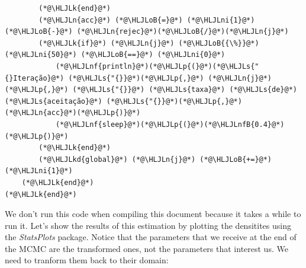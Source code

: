 \documentclass[12pt,a4paper]{article}
\newcommand{\HLJLk}[1]{\textcolor[RGB]{148,91,176}{\textbf{#1}}}
\newcommand{\HLJLkd}[1]{\textcolor[RGB]{214,102,97}{\textit{#1}}}
\newcommand{\HLJLn}[1]{#1}
\newcommand{\HLJLnf}[1]{\textcolor[RGB]{66,102,213}{#1}}
\newcommand{\HLJLs}[1]{\textcolor[RGB]{201,61,57}{#1}}
\newcommand{\HLJLnfB}[1]{\textcolor[RGB]{59,151,46}{#1}}
\newcommand{\HLJLni}[1]{\textcolor[RGB]{59,151,46}{#1}}
\newcommand{\HLJLoB}[1]{\textcolor[RGB]{102,102,102}{\textbf{#1}}}
\newcommand{\HLJLp}[1]{#1}
\begin{document}
\begin{lstlisting}
        (*@\HLJLk{end}@*)
        (*@\HLJLn{acc}@*) (*@\HLJLoB{=}@*) (*@\HLJLni{1}@*) (*@\HLJLoB{-}@*) (*@\HLJLn{rejec}@*)(*@\HLJLoB{/}@*)(*@\HLJLn{j}@*)
        (*@\HLJLk{if}@*) (*@\HLJLn{j}@*) (*@\HLJLoB{{\%}}@*) (*@\HLJLni{50}@*) (*@\HLJLoB{==}@*) (*@\HLJLni{0}@*)
            (*@\HLJLnf{println}@*)(*@\HLJLp{(}@*)(*@\HLJLs{"{}Iteração}@*) (*@\HLJLs{"{}}@*)(*@\HLJLp{,}@*) (*@\HLJLn{j}@*)(*@\HLJLp{,}@*) (*@\HLJLs{"{}}@*) (*@\HLJLs{taxa}@*) (*@\HLJLs{de}@*) (*@\HLJLs{aceitação}@*) (*@\HLJLs{"{}}@*)(*@\HLJLp{,}@*) (*@\HLJLn{acc}@*)(*@\HLJLp{)}@*)
            (*@\HLJLnf{sleep}@*)(*@\HLJLp{(}@*)(*@\HLJLnfB{0.4}@*)(*@\HLJLp{)}@*)
        (*@\HLJLk{end}@*)
        (*@\HLJLkd{global}@*) (*@\HLJLn{j}@*) (*@\HLJLoB{+=}@*) (*@\HLJLni{1}@*)
    (*@\HLJLk{end}@*)
(*@\HLJLk{end}@*)
\end{lstlisting}

We don't run this code when compiling this document because it takes a while to run it. Let's show the results of this estimation by plotting the densitites using the \emph{StatsPlots} package. Notice that the parameters that we receive at the end of the MCMC are the transformed ones, not the parameters that interest us. We need to tranform them back to their domain:
\end{document}
